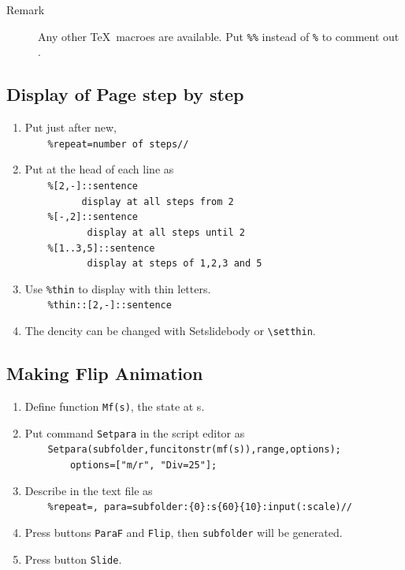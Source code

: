 \documentclass[papersize,a4paper,12pt]{article}
\begin{document}
\begin{description}
\item[Remark]Any other \TeX\ macroes are available. Put \verb|%%| instead of \verb|%| to comment out .
\end{description}

\subsection{Display of Page step by step}

\begin{enumerate}[1)]
\item Put just after new,\\
\verb|    %repeat=number of steps//|
\item Put at the head of each line as\\
\verb|    %[2,-]::sentence|\\
\verb|          display at all steps from 2|\\
\verb|    %[-,2]::sentence|\\
\verb|           display at all steps until 2|\\
\verb|    %[1..3,5]::sentence|\\
\verb|           display at steps of 1,2,3 and 5|
\item  Use \verb|%thin| to display with thin letters.\\
\verb|    %thin::[2,-]::sentence|
\item The dencity can be changed with Setslidebody or \verb|\setthin|.
\end{enumerate}

\subsection{Making Flip Animation}

\begin{enumerate}[1)]
\item Define function \verb|Mf(s)|, the state at s.
\item Put command \verb|Setpara| in the script editor as\\ 
\verb|    Setpara(subfolder,funcitonstr(mf(s)),range,options);|\\
\verb|        options=["m/r", "Div=25"];|
\item Describe in the text file as\\
\verb|    %repeat=, para=subfolder:{0}:s{60}{10}:input(:scale)//|
\item Press buttons \verb|ParaF| and \verb|Flip|, then \verb|subfolder| will be generated.
\item Press button \verb|Slide|.
\end{enumerate}
\end{document}

